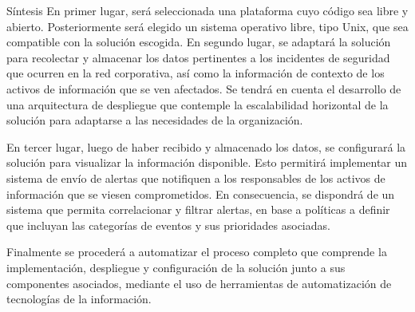     \begin{section}{Síntesis}
    En primer lugar, será seleccionada una plataforma cuyo código sea libre y abierto. Posteriormente será elegido un sistema operativo libre, tipo Unix, que sea compatible con la solución escogida. En segundo lugar, se adaptará la solución para recolectar y almacenar los datos pertinentes a los incidentes de seguridad que ocurren en la red corporativa, así como la información de contexto de los activos de información que se ven afectados. Se tendrá en cuenta el desarrollo de una arquitectura de despliegue que contemple la escalabilidad horizontal de la solución para adaptarse a las necesidades de la organización. \par
	En tercer lugar, luego de haber recibido y almacenado los datos, se configurará la solución para visualizar la información disponible. Esto permitirá implementar un sistema de envío de alertas que notifiquen a los responsables de los activos de información que se viesen comprometidos. En consecuencia, se dispondrá de un sistema que permita correlacionar y filtrar alertas, en base a políticas a definir que incluyan las categorías de eventos y sus prioridades asociadas.\par
	Finalmente se procederá a automatizar el proceso completo que comprende la implementación, despliegue y configuración de la solución junto a sus componentes asociados, mediante el uso de herramientas de automatización de tecnologías de la información. \par
    \end{section}